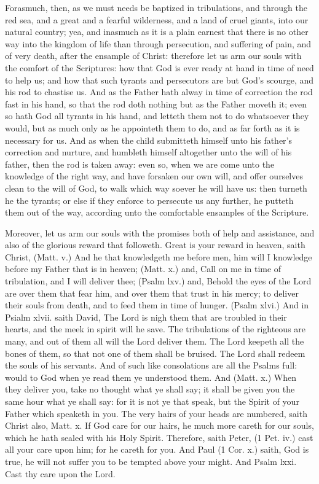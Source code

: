 Forasmuch, then, as we must needs be baptized
in tribulations, and through the red sea, 
and a great and a fearful wilderness, and a land 
of cruel giants, into our natural country; yea,
and inasmuch as it is a plain earnest that there
is no other way into the kingdom of life than
through persecution, and suffering of pain, and 
of very death, after the ensample of Christ:
therefore let us arm our souls with the comfort 
of the Scriptures: how that God is ever ready 
at hand in time of need to help us; and how 
that such tyrants and persecutors are but God's 
scourge, and his rod to chastise us. And as the 
Father hath alway in time of correction the rod 
fast in his hand, so that the rod doth nothing but 
as the Father moveth it; even so hath God all 
tyrants in his hand, and letteth them not to do 
whatsoever they would, but as much only as he 
appointeth them to do, and as far forth as it is 
necessary for us. And as when the child submitteth
himself unto his father's correction and 
nurture, and humbleth himself altogether unto the 
will of his father, then the rod is taken away:
even so, when we are come unto the knowledge 
of the right way, and have forsaken our own 
will, and offer ourselves clean to the will of 
God, to walk which way soever he will have us:
then turneth he the tyrants; or else if they 
enforce to persecute us any further, he putteth
them out of the way, according unto the comfortable
ensamples of the Scripture. 

Moreover, let us arm our souls with the 
promises both of help and assistance, and also of 
the glorious reward that followeth. Great is 
your reward in heaven, saith Christ, (Matt. v.) 
And he that knowledgeth me before men, him
will I knowledge before my Father that is in 
heaven; (Matt. x.) and, Call on me in time of
tribulation, and I will deliver thee; (Psalm lxv.)
and, Behold the eyes of the Lord are over them 
that fear him, and over them that trust in his 
mercy; to deliver their souls from death, and to 
feed them in time of hunger. (Psalm xlvi.) And 
in Psialm xlvii. saith David, The Lord is nigh 
them that are troubled in their hearts, and the 
meek in spirit will he save. The tribulations of 
the righteous are many, and out of them all will 
the Lord deliver them. The Lord keepeth all 
the bones of them, so that not one of them shall be 
bruised. The Lord shall redeem the souls of 
his servants. And of such like consolations are 
all the Psalms full: would to God when ye read 
them ye understood them. And (Matt. x.) When 
they deliver you, take no thought what ye shall 
say; it shall be given you the same hour what ye 
shall say: for it is not ye that speak, but the 
Spirit of your Father which speaketh in you. The 
very hairs of your heads are numbered, saith 
Christ also, Matt. x. If God care for our hairs, 
he much more careth for our souls, which he hath 
sealed with his Holy Spirit. Therefore, saith 
Peter, (1 Pet. iv.) cast all your care upon him;
for he careth for you. And Paul (1 Cor. x.)
saith, God is true, he will not suffer you to be
tempted above your might. And Psalm lxxi.
Cast thy care upon the Lord. 

